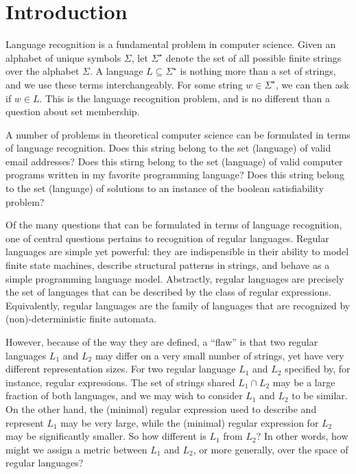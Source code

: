 
\section{Introduction}

Language recognition is a fundamental problem in computer science.
Given an alphabet of unique symbols \(\Sigma\),
let \(\Sigma^\star\) denote the set of all possible finite strings over
the alphabet \(\Sigma\).
A language \(L \subseteq \Sigma^\star\) is nothing more than a set of strings,
and we use these terms interchangeably.
For some string \(w \in \Sigma^\star\),
we can then ask if \(w \in L\).
This is the language recognition problem,
and is no different than a question about set membership.

A number of problems in theoretical computer science can be formulated
in terms of language recognition.
Does this string belong to the set (language) of valid email addresses?
Does this stirng belong to the set (language) of valid
computer programs written in my favorite programming language?
Does this string belong to the set (language) of solutions
to an instance of the boolean satisfiability problem?

Of the many questions that can be formulated in terms of language recognition,
one of central questions pertains to recognition of regular languages.
Regular languages are simple yet powerful:
they are indispensible in their ability to model
finite state machines,
describe structural patterns in strings,
and behave as a simple programming language model.
Abstractly, regular languages are precisely the set of languages that
can be described by the class of regular expressions.
Equivalently, regular languages are the family of languages
that are recognized by (non)-deterministic finite automata.

However, because of the way they are defined, a ``flaw'' is that
two regular languages \(L_1\) and \(L_2\) may differ on a very small number
of strings, yet have very different representation sizes.
For two regular language \(L_1\) and \(L_2\) specified by,
for instance, regular expressions.
The set of strings shared \(L_1 \cap L_2\) may be a large fraction of both
languages, and we may wish to consider \(L_1\) and \(L_2\) to be similar.
On the other hand,
the (minimal) regular expression used to describe and represent
\(L_1\) may be very large, while the (minimal) regular
expression for \(L_2\) may be significantly smaller.
So how different is \(L_1\) from \(L_2\)?
In other words, how might we assign a metric between \(L_1\) and \(L_2\),
or more generally, over the space of regular languages?

